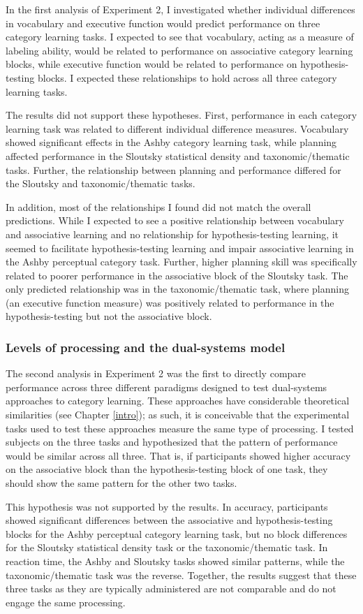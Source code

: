 \documentclass[../dissertation.tex]{subfiles}
\begin{document}
	In the first analysis of Experiment 2, I investigated whether individual differences in vocabulary and executive function would predict performance on three category learning tasks. I expected to see that vocabulary, acting as a measure of labeling ability, would be related to performance on associative category learning blocks, while executive function would be related to performance on hypothesis-testing blocks. I expected these relationships to hold across all three category learning tasks. \par
	The results did not support these hypotheses. First, performance in each category learning task was related to different individual difference measures. Vocabulary showed significant effects in the Ashby category learning task, while planning affected performance in the Sloutsky statistical density and taxonomic/thematic tasks. Further, the relationship between planning and performance differed for the Sloutsky and taxonomic/thematic tasks. \par 
	In addition, most of the relationships I found did not match the overall predictions. While I expected to see a positive relationship between vocabulary and associative learning and no relationship for hypothesis-testing learning, it seemed to facilitate hypothesis-testing learning and impair associative learning in the Ashby perceptual category task. Further, higher planning skill was specifically related to poorer performance in the associative block of the Sloutsky task. The only predicted relationship was in the taxonomic/thematic task, where planning (an executive function measure) was positively related to performance in the hypothesis-testing but not the associative block.
	
\subsubsection{Levels of processing and the dual-systems model}

The second analysis in Experiment 2 was the first to directly compare performance across three different paradigms designed to test dual-systems approaches to category learning. These approaches have considerable theoretical similarities (see Chapter \ref{intro}); as such, it is conceivable that the experimental tasks used to test these approaches measure the same type of processing. I tested subjects on the three tasks and hypothesized that the pattern of performance would be similar across all three. That is, if participants showed higher accuracy on the associative block than the hypothesis-testing block of one task, they should show the same pattern for the other two tasks. \par
This hypothesis was not supported by the results. In accuracy, participants showed significant differences between the associative and hypothesis-testing blocks for the Ashby perceptual category learning task, but no block differences for the Sloutsky statistical density task or the taxonomic/thematic task. In reaction time, the Ashby and Sloutsky tasks showed similar patterns, while the taxonomic/thematic task was the reverse. Together, the results suggest that these three tasks as they are typically administered are not comparable and do not engage the same processing.
\end{document}
